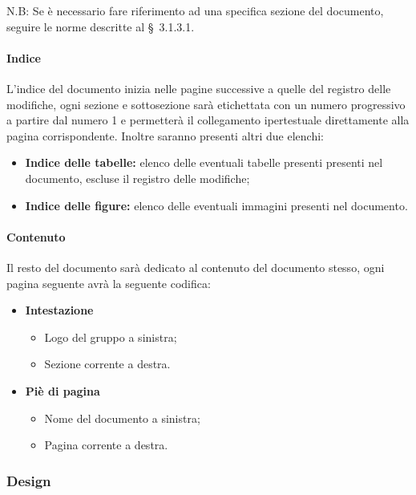 \documentclass[11pt,a4paper]{article}
\begin{document}
{	N.B: Se è necessario fare riferimento ad una specifica sezione del documento, seguire le norme descritte al \S\ 3.1.3.1.
	\paragraph{Indice\\}
	L'indice del documento inizia nelle pagine successive a quelle del registro delle modifiche, ogni sezione e sottosezione sarà etichettata con un numero progressivo a partire dal numero 1 e permetterà il collegamento ipertestuale direttamente alla pagina corrispondente. Inoltre saranno presenti altri due elenchi:
	
	\begin{itemize}
		\item \textbf{Indice delle tabelle:} elenco delle eventuali tabelle presenti presenti nel documento, escluse il registro delle modifiche;
		\item  \textbf{Indice delle figure:} elenco delle eventuali immagini presenti nel documento. 
	\end{itemize}
	
	\paragraph{Contenuto\\}
	Il resto del documento sarà dedicato al contenuto del documento stesso, ogni pagina seguente avrà la seguente codifica:
	\begin{itemize}
		\item \textbf{Intestazione}
		\begin{itemize}
			\item Logo del gruppo a sinistra;
			\item Sezione corrente a destra.
		\end{itemize}
		
		\item \textbf{Piè di pagina} 
		\begin{itemize}
			\item Nome del documento a sinistra;
			\item Pagina corrente a destra.
		\end{itemize}
	\end{itemize}
	
	\subsubsection{Design}
	
}
\end{document}
